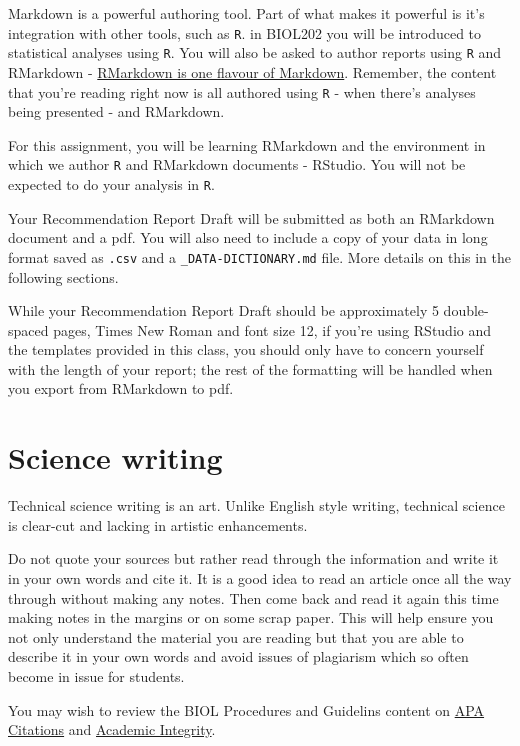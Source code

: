 \documentclass[
]{book}
\begin{document}
Markdown is a powerful authoring tool. Part of what makes it powerful is it's integration with other tools, such as \texttt{R}. in BIOL202 you will be introduced to statistical analyses using \texttt{R}. You will also be asked to author reports using \texttt{R} and RMarkdown - \href{https://ubco-biology.github.io/Procedures-and-Guidelines/markdown-flavours.html}{RMarkdown is one flavour of Markdown}. Remember, the content that you're reading right now is all authored using \texttt{R} - when there's analyses being presented - and RMarkdown.

For this assignment, you will be learning RMarkdown and the environment in which we author \texttt{R} and RMarkdown documents - RStudio. You will not be expected to do your analysis in \texttt{R}.

Your Recommendation Report Draft will be submitted as both an RMarkdown document and a pdf. You will also need to include a copy of your data in long format saved as \texttt{.csv} and a \texttt{\_DATA-DICTIONARY.md} file. More details on this in the following sections.

While your Recommendation Report Draft should be approximately 5 double-spaced pages, Times New Roman and font size 12, if you're using RStudio and the templates provided in this class, you should only have to concern yourself with the length of your report; the rest of the formatting will be handled when you export from RMarkdown to pdf.

\hypertarget{science-writing}{%
\section*{Science writing}\label{science-writing}}

Technical science writing is an art. Unlike English style writing, technical science is clear-cut and lacking in artistic enhancements.

Do not quote your sources but rather read through the information and write it in your own words and cite it. It is a good idea to read an article once all the way through without making any notes. Then come back and read it again this time making notes in the margins or on some scrap paper. This will help ensure you not only understand the material you are reading but that you are able to describe it in your own words and avoid issues of plagiarism which so often become in issue for students.

You may wish to review the BIOL Procedures and Guidelins content on \href{https://ubco-biology.github.io/Procedures-and-Guidelines/apa-citations.html}{APA Citations} and \href{https://ubco-biology.github.io/Procedures-and-Guidelines/academic-integrity.html}{Academic Integrity}.
\end{document}
